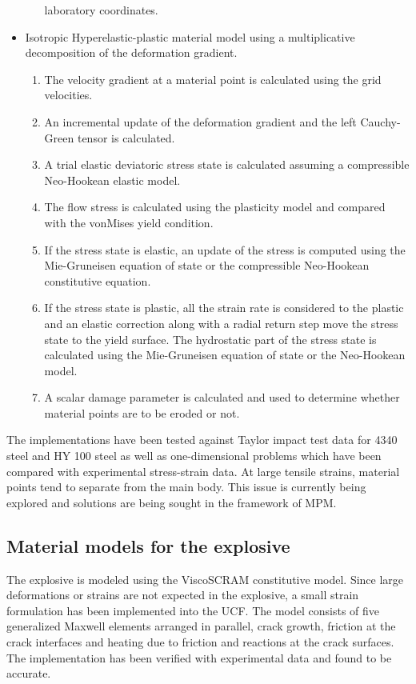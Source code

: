 \begin{itemize}
\begin{enumerate}
              laboratory coordinates.
     \end{enumerate}
   \item Isotropic Hyperelastic-plastic material model using a 
         multiplicative decomposition of the deformation gradient.
     \begin{enumerate}
        \item The velocity gradient at a material point
              is calculated using the grid velocities.
        \item An incremental update of the deformation gradient and
              the left Cauchy-Green tensor is calculated.
        \item A trial elastic deviatoric stress state is calculated
              assuming a compressible Neo-Hookean elastic model.
        \item The flow stress is calculated using the plasticity
              model and compared with the vonMises yield condition.
        \item If the stress state is elastic, an update of the 
              stress is computed using the Mie-Gruneisen equation
              of state or the compressible Neo-Hookean constitutive
              equation.
        \item If the stress state is plastic, all the strain rate 
              is considered to the plastic and an elastic correction
              along with a radial return step move the stress state
              to the yield surface.  The hydrostatic part of the 
              stress state is calculated using the Mie-Gruneisen
              equation of state or the Neo-Hookean model.
        \item A scalar damage parameter is calculated and used
              to determine whether material points are to be eroded
              or not.
     \end{enumerate}
\end{itemize}

The implementations have been tested against Taylor impact test data
for 4340 steel and HY 100 steel as well as one-dimensional problems
which have been compared with experimental stress-strain data.  At 
large tensile strains, material points tend to separate from the 
main body.  This issue is currently being explored and solutions are
being sought in the framework of MPM.

\subsection{Material models for the explosive}
The explosive is modeled using the ViscoSCRAM constitutive 
model.  Since large deformations or strains are not expected in 
the explosive, a small strain formulation has been implemented into 
the UCF.  The model consists of five generalized Maxwell elements
arranged in parallel, crack growth, friction at the crack 
interfaces and heating due to friction and reactions at the 
crack surfaces.  The implementation has been verified with 
experimental data and found to be accurate.

%

